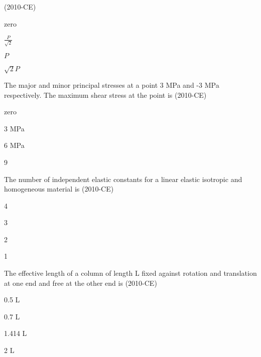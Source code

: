 \hfill{(2010-CE)}




     
\begin{enumerate}
    \begin{multicols}{4} 
	\item zero
	\item $\frac{P}{\sqrt{2}}$
	\item $P$
	\item $\sqrt{2}P$
  \end{multicols}
\end{enumerate}




\item The major and minor principal stresses at a point 3 MPa and -3 MPa respectively. The maximum shear stress at the point is \hfill{(2010-CE)}

\begin{enumerate}
    \begin{multicols}{4} 
	\item zero
		\item 3 MPa
		\item 6 MPa
		\item 9 
		  \end{multicols}
		  \end{enumerate}
	
\item The number of independent elastic constants for a linear elastic isotropic and homogeneous material is \hfill{(2010-CE)}

\begin{enumerate}
    \begin{multicols}{4} 
	\item 4
	\item 3
	\item 2
	\item 1
	  \end{multicols}
\end{enumerate}
			 
\item The effective length of a column of length L fixed against rotation and translation at one end and free at the other end is \hfill{(2010-CE)}

\begin{enumerate}
    \begin{multicols}{4} 
	\item 0.5 L
\item 0.7 L
\item 1.414 L
\item 2 L
  \end{multicols}
\end{enumerate}

